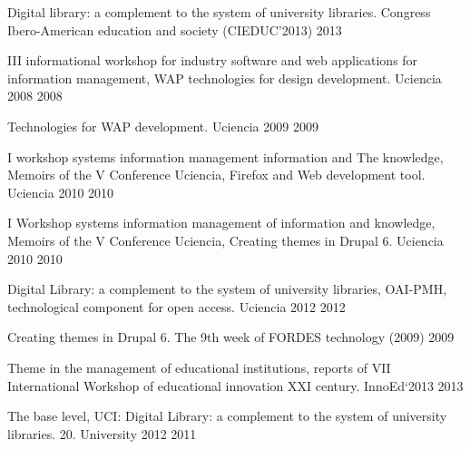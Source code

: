 \begin{cventries}
\cventry
{Digital library: a complement to the system of university libraries.} %
{Congress Ibero-American education and society (CIEDUC'2013)} %
{} %
{2013} %
{ %
}

\cventry
{III informational workshop for industry software and web applications for information management, WAP technologies for design development.} %
{Uciencia 2008} %
{} %
{2008} %
{ %
}

\cventry
{Technologies for WAP development.} %
{Uciencia 2009} %
{} %
{2009} %
{ %
}

\cventry
{I workshop systems information management information and The knowledge, Memoirs of the V Conference Uciencia, Firefox and Web development tool.} %
{Uciencia 2010} %
{} %
{2010} %
{ %
}

\cventry
{I Workshop systems information management of information and knowledge, Memoirs of the V Conference Uciencia, Creating themes in Drupal 6.} %
{Uciencia 2010} %
{} %
{2010} %
{ %
}

\cventry
{Digital Library: a complement to the system of university libraries, OAI-PMH, technological component for open access.} %
{Uciencia 2012} %
{} %
{2012} %
{ %
}

\cventry
{Creating themes in Drupal 6.} %
{The 9th week of FORDES technology (2009)} %
{} %
{2009} %
{ %
}

\cventry
{Theme in the management of educational institutions, reports of VII International Workshop of educational innovation XXI century.} %
{InnoEd`2013} %
{} %
{2013} %
{ %
}

\cventry
{The base level, UCI: Digital Library: a complement to the system of university libraries.} %
{20. University 2012 } %
{} %
{2011} %
{ %
}


\end{cventries}

